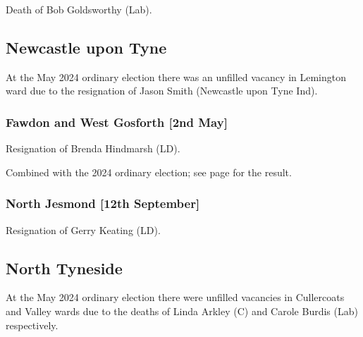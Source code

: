 \documentclass[a4paper,openany]{book}
\begin{document}
\begin{resultsiii}

Death of Bob Goldsworthy (Lab).

\subsection*{Newcastle upon Tyne}

At the May 2024 ordinary election there was an unfilled vacancy in Lemington ward due to the resignation of Jason Smith (Newcastle upon Tyne Ind).%

\subsubsection*{Fawdon and West Gosforth \hspace*{\fill}\nolinebreak[1]%
	\enspace\hspace*{\fill}
	[2nd May]}


Resignation of Brenda Hindmarsh (LD).

Combined with the 2024 ordinary election; see page \pageref{FawdonWestGosforth} for the result.

\subsubsection*{North Jesmond \hspace*{\fill}\nolinebreak[1]%
	\enspace\hspace*{\fill}
	[12th September]}


Resignation of Gerry Keating (LD).

\subsection*{North Tyneside}

At the May 2024 ordinary election there were unfilled vacancies in Cullercoats and Valley wards due to the deaths of Linda Arkley (C) and Carole Burdis (Lab) respectively.%


\end{resultsiii}
\end{document}
